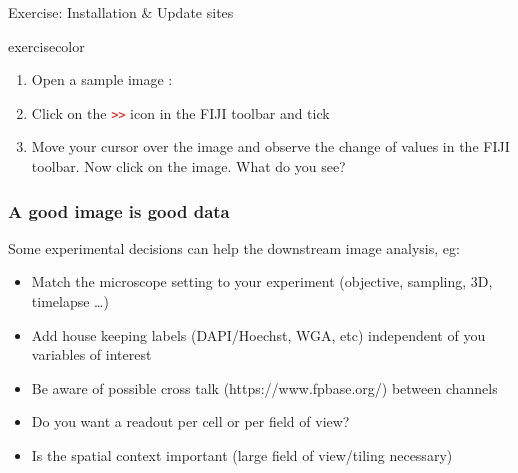\documentclass[ignorenonframetext,aspectratio=169,10pt,xcolor=table]{beamer}
\begin{document}
\begin{frame}{Exercise: Installation \& Update sites}

  \begin{beamercolorbox}[rounded=true, shadow=true, wd=\textwidth, sep=-1em]{exercisecolor}%
    \begin{enumerate}
      \item Open a sample image : 
      \item Click on the \textcolor{red}{\texttt{>>}} icon in the FIJI toolbar and tick
      \item Move your cursor over the image and observe the change of values in the FIJI toolbar. Now click on the image. What do you see?
    \end{enumerate}
  \end{beamercolorbox}

\end{frame}

\begin{frame} \frametitle{A good image is good data}
  Some experimental decisions can help the downstream image analysis, eg:\\[1em]
  \begin{itemize}
    \item Match the microscope setting to your experiment (objective, sampling, 3D, timelapse \dots)
    \item Add house keeping labels (DAPI/Hoechst, WGA, etc) independent of you variables of interest
    \item Be aware of possible cross talk (https://www.fpbase.org/) between channels
    \item Do you want a readout per cell or per field of view?
    \item Is the spatial context important (large field of view/tiling necessary)
  \end{itemize}
\end{frame}
\end{document}
